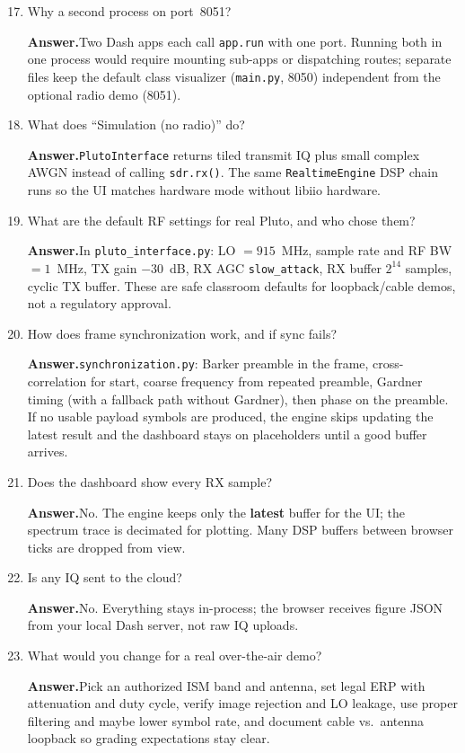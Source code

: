\documentclass[11pt]{article}
\newenvironment{qaitem}{%
  \begin{enumerate}[label=\textbf{Q\arabic*.}, leftmargin=2.2em, itemsep=1.1em, listparindent=0pt]
}{%
  \end{enumerate}%
}
\newcommand{\Ans}{\par\noindent\textbf{Answer.}\quad}
\begin{document}
\begin{qaitem}
  \setcounter{enumi}{16}
  \item Why a second process on port~8051?
  \Ans Two Dash apps each call \texttt{app.run} with one port. Running both in one process would require mounting sub-apps or dispatching routes; separate files keep the default class visualizer (\texttt{main.py}, 8050) independent from the optional radio demo (8051).

  \item What does ``Simulation (no radio)'' do?
  \Ans \texttt{PlutoInterface} returns tiled transmit IQ plus small complex AWGN instead of calling \texttt{sdr.rx()}. The same \texttt{RealtimeEngine} DSP chain runs so the UI matches hardware mode without libiio hardware.

  \item What are the default RF settings for real Pluto, and who chose them?
  \Ans In \texttt{pluto\_interface.py}: LO $=\!915$~MHz, sample rate and RF BW $=\!1$~MHz, TX gain $-30$~dB, RX AGC \texttt{slow\_attack}, RX buffer $2^{14}$ samples, cyclic TX buffer. These are safe classroom defaults for loopback/cable demos, not a regulatory approval.

  \item How does frame synchronization work, and if sync fails?
  \Ans \texttt{synchronization.py}: Barker preamble in the frame, cross-correlation for start, coarse frequency from repeated preamble, Gardner timing (with a fallback path without Gardner), then phase on the preamble. If no usable payload symbols are produced, the engine skips updating the latest result and the dashboard stays on placeholders until a good buffer arrives.

  \item Does the dashboard show every RX sample?
  \Ans No. The engine keeps only the \textbf{latest} buffer for the UI; the spectrum trace is decimated for plotting. Many DSP buffers between browser ticks are dropped from view.

  \item Is any IQ sent to the cloud?
  \Ans No. Everything stays in-process; the browser receives figure JSON from your local Dash server, not raw IQ uploads.

  \item What would you change for a real over-the-air demo?
  \Ans Pick an authorized ISM band and antenna, set legal ERP with attenuation and duty cycle, verify image rejection and LO leakage, use proper filtering and maybe lower symbol rate, and document cable vs.\ antenna loopback so grading expectations stay clear.
\end{qaitem}
\end{document}
